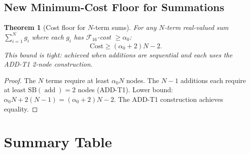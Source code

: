 \documentclass[12pt,a4paper]{article}
\newtheorem{theorem}{Theorem}[section]
\theoremstyle{definition}
\newcommand{\addop}{\operatorname{add}}
\newcommand{\SB}{\mathrm{SB}}
\newcommand{\Cost}{\mathrm{Cost}}
\begin{document}
\subsection{New Minimum-Cost Floor for Summations}

\begin{theorem}[Cost floor for $N$-term sums]
For any $N$-term real-valued sum $\sum_{i=1}^N g_i$ where each $g_i$ has
$\mathcal{F}_{16}$-cost $\ge \alpha_0$:
\[
  \Cost \ge (\alpha_0 + 2)N - 2.
\]
This bound is \emph{tight}: achieved when additions are sequential and
each uses the ADD-T1 2-node construction.
\end{theorem}

\begin{proof}
The $N$ terms require at least $\alpha_0 N$ nodes.
The $N - 1$ additions each require at least $\SB(\addop) = 2$ nodes (ADD-T1).
Lower bound: $\alpha_0 N + 2(N-1) = (\alpha_0 + 2)N - 2$.
The ADD-T1 construction achieves equality.
\end{proof}

\section{Summary Table}
\label{sec:summary}
\end{document}
